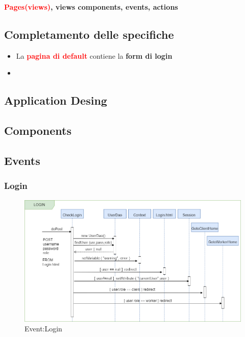 \documentclass[a4paper, 12pt]{article}
\begin{document}
\noindent \textbf{\textcolor{red}{Pages(views)}, \textcolor{myGreen}{views components}, \textcolor{myBlue}{events}, \textcolor{myBrown}{actions}}
\subsection{Completamento delle specifiche}
\begin{itemize}
	\item La \textbf{\textcolor{red}{pagina di default}} contiene la \textbf{\textcolor{myGreen}{form di login}}
	\item 
\end{itemize}
\subsection{Application Desing}
\subsection{Components}
\subsection{Events}
\subsubsection{Login}
\begin{figure}[h!]
	\centering
	\includegraphics[width=1\textwidth]{Login.png}
	\caption{Event:Login}
	\label{figure:login_sd}
\end{figure}
\end{document}
